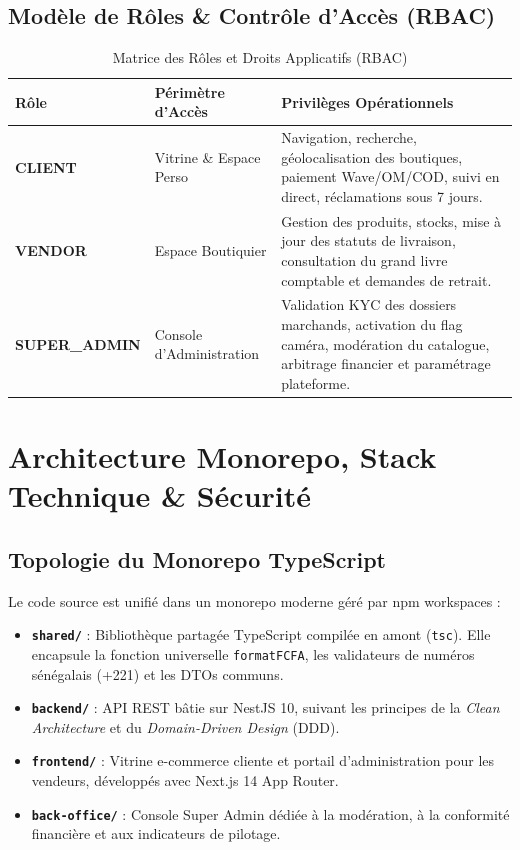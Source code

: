 \documentclass[11pt,a4paper,titlepage]{report}
\begin{document}
\section{Modèle de Rôles \& Contrôle d'Accès (RBAC)}
\begin{table}[h!]
\centering
\small
\begin{tabularx}{\textwidth}{@{}llX@{}}
\toprule
\rowcolor{tableheader}
\textbf{Rôle} & \textbf{Périmètre d'Accès} & \textbf{Privilèges Opérationnels} \\
\midrule
\textbf{CLIENT} & Vitrine \& Espace Perso & Navigation, recherche, géolocalisation des boutiques, paiement Wave/OM/COD, suivi en direct, réclamations sous 7 jours. \\
\textbf{VENDOR} & Espace Boutiquier & Gestion des produits, stocks, mise à jour des statuts de livraison, consultation du grand livre comptable et demandes de retrait. \\
\textbf{SUPER\_ADMIN} & Console d'Administration & Validation KYC des dossiers marchands, activation du flag caméra, modération du catalogue, arbitrage financier et paramétrage plateforme. \\
\bottomrule
\end{tabularx}
\caption{Matrice des Rôles et Droits Applicatifs (RBAC)}
\end{table}

\chapter{Architecture Monorepo, Stack Technique \& Sécurité}

\section{Topologie du Monorepo TypeScript}
Le code source est unifié dans un monorepo moderne géré par npm workspaces :
\begin{itemize}
    \item \textbf{\texttt{shared/}} : Bibliothèque partagée TypeScript compilée en amont (\texttt{tsc}). Elle encapsule la fonction universelle \texttt{formatFCFA}, les validateurs de numéros sénégalais (+221) et les DTOs communs.
    \item \textbf{\texttt{backend/}} : API REST bâtie sur NestJS 10, suivant les principes de la \textit{Clean Architecture} et du \textit{Domain-Driven Design} (DDD).
    \item \textbf{\texttt{frontend/}} : Vitrine e-commerce cliente et portail d'administration pour les vendeurs, développés avec Next.js 14 App Router.
    \item \textbf{\texttt{back-office/}} : Console Super Admin dédiée à la modération, à la conformité financière et aux indicateurs de pilotage.
\end{itemize}
\end{document}
